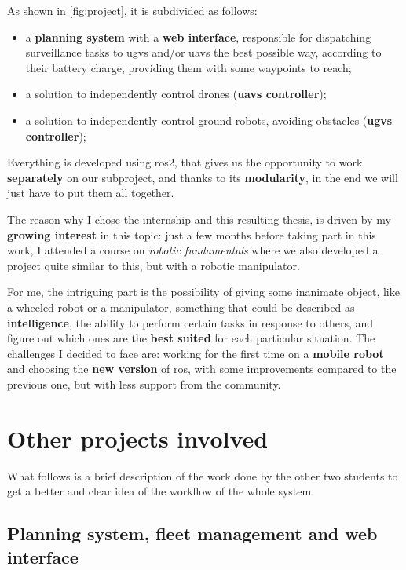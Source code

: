 \bigskip

As shown in \autoref{fig:project}, it is subdivided as follows: 

\begin{itemize}
  \item a \textbf{planning system} with a \textbf{web interface}, responsible for dispatching surveillance tasks to \acrfull{ugvs} and/or \acrfull{uavs} the best possible way, according to their battery charge, providing them with some waypoints to reach; 
  \item a solution to independently control drones (\textbf{\acrshort{uavs} controller});
  \item a solution to independently control ground robots, avoiding obstacles (\textbf{\acrshort{ugvs} controller});
\end{itemize}

Everything is developed using \acrfull{ros}2, that gives us the opportunity to work \textbf{separately} on our subproject, and thanks to its \textbf{modularity}, in the end we will just have to put them all together.

The reason why I chose the internship and this resulting thesis, is driven by my \textbf{growing interest} in this topic: just a few months before taking part in this work, I attended a course on \textit{robotic fundamentals}\cite{intro2robotics} where we also developed a project quite similar to this, but with a robotic manipulator.

For me, the intriguing part is the possibility of giving some inanimate object, like a wheeled robot or a manipulator, something that could be described as \textbf{intelligence}, the ability to perform certain tasks in response to others, and figure out which ones are the \textbf{best suited} for each particular situation. The challenges I decided to face are: working for the first time on a \textbf{mobile robot} and choosing the \textbf{new version} of \acrshort{ros}, with some improvements compared to the previous one, but with less support from the community.

\section{Other projects involved}

What follows is a brief description of the work done by the other two students to get a better and clear idea of the workflow of the whole system.

\subsection{Planning system, fleet management and web interface}
\label{sub:planning}

